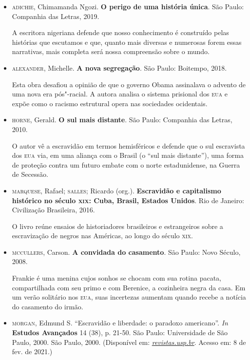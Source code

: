 \documentclass[11pt]{extarticle}
\begin{document}
\begin{itemize}
\item\textsc{adichie}, Chimamanda Ngozi. \textbf{O perigo de uma história única}.
  São Paulo: Companhia das Letras, 2019.

A escritora nigeriana defende que nosso conhecimento é construído pelas
histórias que escutamos e que, quanto mais diversas e numerosas forem
essas narrativas, mais completa será nossa compreensão sobre o mundo.

\item\textsc{alexander}, Michelle. \textbf{A nova segregação}. São Paulo: Boitempo,
  2018.

Esta obra desafiou a opinião de que o governo Obama assinalava o advento
de uma nova era pós"-racial. A autora analisa o sistema prisional dos \textsc{eua}
e expõe como o racismo estrutural opera nas sociedades ocidentais.

\item\textsc{horne}, Gerald. \textbf{O sul mais distante}. São Paulo: Companhia das
  Letras, 2010.

O autor vê a escravidão em termos hemisféricos e defende que o sul
escravista dos \textsc{eua} via, em uma aliança com o Brasil (o ``sul mais
distante''), uma forma de proteção contra um futuro embate com o norte
estadunidense, na Guerra de Secessão.

\item\textsc{marquese}, Rafael; \textsc{salles}; Ricardo (org.). \textbf{Escravidão e
  capitalismo histórico no século \textsc{xix}: Cuba, Brasil, Estados Unidos}.
  Rio de Janeiro: Civilização Brasileira, 2016.

O livro reúne ensaios de historiadores brasileiros e estrangeiros sobre
a escravização de negros nas Américas, ao longo do século \textsc{xix}.

\item\textsc{mccullers}, Carson. \textbf{A convidada do casamento}. São Paulo: Novo
  Século, 2008.

Frankie é uma menina cujos sonhos se chocam com sua rotina pacata,
compartilhada com seu primo e com Berenice, a cozinheira negra da casa.
Em um verão solitário nos \textsc{eua}, suas incertezas aumentam quando recebe a
notícia do casamento do irmão.

\item\textsc{morgan}, Edmund S. ``Escravidão e liberdade: o paradoxo americano''.
  \emph{In} \textbf{Estudos Avançados} 14 (38), p. 21-50. São Paulo:
  Universidade de São Paulo, 2000. São Paulo, 2000. (Disponível em:
  \href{http://www.revistas.usp.br/eav/article/view/9507}{\emph{revistas.usp.br}}.
  Acesso em: 8 de fev. de 2021.)


\end{itemize}
\end{document}
